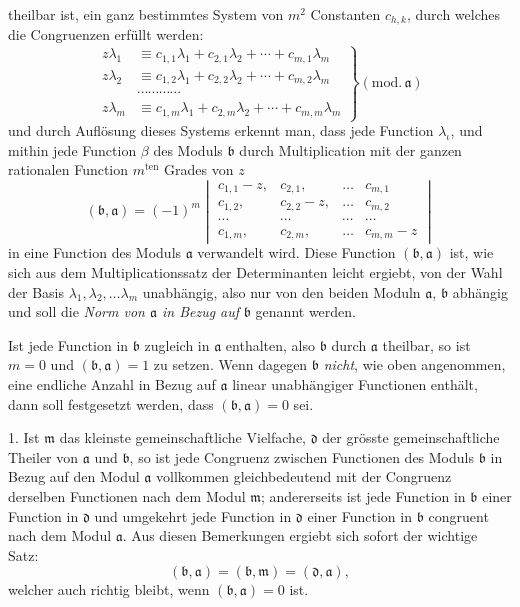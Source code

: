 \documentclass{article}
\begin{document}
theilbar ist, ein ganz bestimmtes System von $m^{2}$ Constanten $c_{h,k}$, durch welches die Congruenzen erfüllt werden:
\[ \left. \begin{aligned} z\lambda_{1} &\equiv c_{1,1}\lambda_{1} + c_{2,1}\lambda_{2} + \cdots + c_{m,1}\lambda_{m} \\ z\lambda_{2} &\equiv c_{1,2}\lambda_{1} + c_{2,2}\lambda_{2} + \cdots + c_{m,2}\lambda_{m} \\ &\cdots\cdots\cdots\cdots \\ z\lambda_{m} &\equiv c_{1,m}\lambda_{1} + c_{2,m}\lambda_{2} + \cdots + c_{m,m}\lambda_{m} \end{aligned} \right\} (\text{mod.}\,\mathfrak{a}) \]
und durch Auflösung dieses Systems erkennt man, dass jede Function $\lambda_{\iota}$, und mithin jede Function $\beta$ des Moduls $\mathfrak{b}$ durch Multiplication mit der ganzen rationalen Function $m^{\text{ten}}$ Grades von $z$
\[ (\mathfrak{b}, \mathfrak{a}) = (-1)^{m} \begin{vmatrix} c_{1,1}-z, & c_{2,1}, & \ldots & c_{m,1} \\ c_{1,2}, & c_{2,2}-z, & \ldots & c_{m,2} \\ \cdots & \cdots & \cdots & \cdots \\ c_{1,m}, & c_{2,m}, & \ldots & c_{m,m}-z \end{vmatrix} \]
in eine Function des Moduls $\mathfrak{a}$ verwandelt wird. Diese Function $(\mathfrak{b}, \mathfrak{a})$ ist, wie sich aus dem Multiplicationssatz der Determinanten leicht ergiebt, von der Wahl der Basis $\lambda_{1}, \lambda_{2}, \ldots \lambda_{m}$ unabhängig, also nur von den beiden Moduln $\mathfrak{a}$, $\mathfrak{b}$ abhängig und soll die \emph{Norm von $\mathfrak{a}$ in Bezug auf} $\mathfrak{b}$ genannt werden.

Ist jede Function in $\mathfrak{b}$ zugleich in $\mathfrak{a}$ enthalten, also $\mathfrak{b}$ durch $\mathfrak{a}$ theilbar, so ist $m = 0$ und $(\mathfrak{b}, \mathfrak{a}) = 1$ zu setzen. Wenn dagegen $\mathfrak{b}$ \emph{nicht}, wie oben angenommen, eine endliche Anzahl in Bezug auf $\mathfrak{a}$ linear unabhängiger Functionen enthält, dann soll festgesetzt werden, dass $(\mathfrak{b}, \mathfrak{a}) = 0$ sei.

1. Ist $\mathfrak{m}$ das kleinste gemeinschaftliche Vielfache, $\mathfrak{d}$ der grösste gemeinschaftliche Theiler von $\mathfrak{a}$ und $\mathfrak{b}$, so ist jede Congruenz zwischen Functionen des Moduls $\mathfrak{b}$ in Bezug auf den Modul $\mathfrak{a}$ vollkommen gleichbedeutend mit der Congruenz derselben Functionen nach dem Modul $\mathfrak{m}$; andererseits ist jede Function in $\mathfrak{b}$ einer Function in $\mathfrak{d}$ und umgekehrt jede Function in $\mathfrak{d}$ einer Function in $\mathfrak{b}$ congruent nach dem Modul $\mathfrak{a}$. Aus diesen Bemerkungen ergiebt sich sofort der wichtige Satz:
\[ (\mathfrak{b}, \mathfrak{a}) = (\mathfrak{b}, \mathfrak{m}) = (\mathfrak{d}, \mathfrak{a}), \]
welcher auch richtig bleibt, wenn $(\mathfrak{b}, \mathfrak{a}) = 0$ ist.
\end{document}
